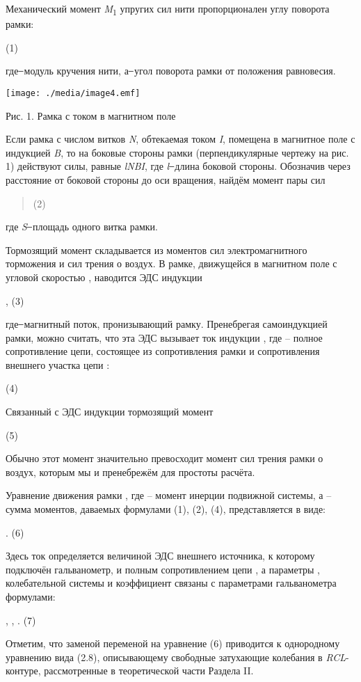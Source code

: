 \documentclass[]{article}
\begin{document}
Механический момент \emph{M}\textsubscript{1} упругих сил нити
пропорционален углу поворота рамки:

(1)

где ̶ модуль кручения нити, а ̶ угол поворота рамки от положения
равновесия.

\texttt{[image: ./media/image4.emf]}

Рис. 1. Рамка с током в магнитном поле

Если рамка с числом витков \emph{N}, обтекаемая током \emph{I}, помещена
в магнитное поле с индукцией \emph{B}, то на боковые стороны рамки
(перпендикулярные чертежу на рис. 1) действуют силы, равные \emph{lNBI},
где \emph{l} ̶ длина боковой стороны. Обозначив через расстояние от
боковой стороны до оси вращения, найдём момент пары сил

\begin{quote}
(2)
\end{quote}

где \emph{S} ̶ площадь одного витка рамки.

Тормозящий момент складывается из моментов сил электромагнитного
торможения и сил трения о воздух. В рамке, движущейся в магнитном поле с
угловой скоростью , наводится ЭДС индукции

, (3)

где ̶ магнитный поток, пронизывающий рамку. Пренебрегая самоиндукцией
рамки, можно считать, что эта ЭДС вызывает ток индукции , где -- полное
сопротивление цепи, состоящее из сопротивления рамки и сопротивления
внешнего участка цепи :

(4)

Связанный с ЭДС индукции тормозящий момент

(5)

Обычно этот момент значительно превосходит момент сил трения рамки о
воздух, которым мы и пренебрежём для простоты расчёта.

Уравнение движения рамки , где -- момент инерции подвижной системы, а --
сумма моментов, даваемых формулами (1), (2), (4), представляется в виде:

. (6)

Здесь ток определяется величиной ЭДС внешнего источника, к которому
подключён гальванометр, и полным сопротивлением цепи , а параметры ,
колебательной системы и коэффициент связаны с параметрами гальванометра
формулами:

, , . (7)

Отметим, что заменой переменой на уравнение (6) приводится к однородному
уравнению вида (2.8), описывающему свободные затухающие колебания в
\emph{RCL}-контуре, рассмотренные в теоретической части Раздела II.
\end{document}
